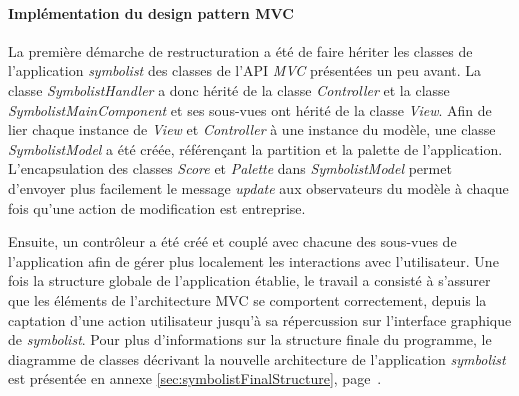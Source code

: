 \paragraph{Implémentation du design pattern MVC} La première démarche de restructuration a été de faire hériter les classes de l'application \textit{symbolist} des classes de l'API \textit{MVC} présentées un peu avant.
La classe \textit{SymbolistHandler} a donc hérité de la classe \textit{Controller} et la classe \textit{SymbolistMainComponent} et ses sous-vues ont hérité de la classe \textit{View}.
Afin de lier chaque instance de \textit{View} et \textit{Controller} à une instance du modèle, une classe \textit{SymbolistModel} a été créée, référençant la partition et la palette de l'application.
L'encapsulation des classes \textit{Score} et \textit{Palette} dans \textit{SymbolistModel} permet d'envoyer plus facilement le message \textit{update} aux observateurs du modèle à chaque fois qu'une action de modification est entreprise.

Ensuite, un contrôleur a été créé et couplé avec chacune des sous-vues de l'application afin de gérer plus localement les interactions avec l'utilisateur.  
Une fois la structure globale de l'application établie, le travail a consisté à s'assurer que les éléments de l'architecture MVC se comportent correctement, depuis la captation d'une action utilisateur jusqu'à sa répercussion sur l'interface graphique de \textit{symbolist}.
Pour plus d'informations sur la structure finale du programme, le diagramme de classes décrivant la nouvelle architecture de l'application \textit{symbolist} est présentée en annexe \ref{sec:symbolistFinalStructure}, page~\pageref{sec:symbolistFinalStructure}.

